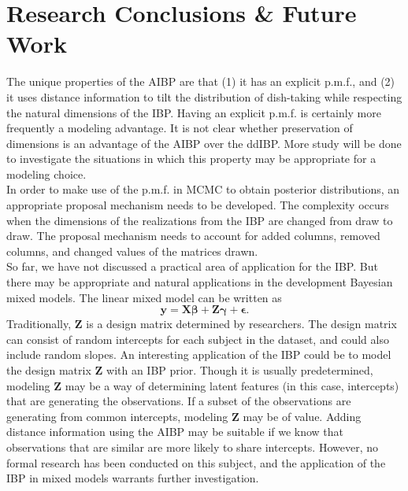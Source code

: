 \chapter{Research Conclusions \& Future Work}
The unique properties of the AIBP are that (1) it has an explicit p.m.f., and
(2) it uses distance information to tilt the distribution of dish-taking
while respecting the natural dimensions of the IBP. Having an explicit p.m.f.
is certainly more frequently a modeling advantage. It is not clear whether 
preservation of dimensions is an advantage of the AIBP over the ddIBP. More study
will be done to investigate the situations in which this property may be 
appropriate for a modeling choice.\\

\noindent
In order to make use of the p.m.f. in MCMC to obtain posterior distributions, an
appropriate proposal mechanism needs to be developed. The complexity occurs when
the dimensions of the realizations from the IBP are changed from draw to draw. 
The proposal mechanism needs to account for added columns, removed columns, and 
changed values of the matrices drawn. \\

\noindent
So far, we have not discussed a practical area of application for the IBP.
But there may be appropriate and natural applications in the development Bayesian
mixed models. The linear mixed model can be written as
\[
  \bm{y = X\beta + Z\gamma + \epsilon}.
\]
Traditionally, $\bm Z$ is a design matrix determined by researchers. The design
matrix can consist of random intercepts for each subject in the dataset, and
could also include random slopes. An interesting application of the IBP could
be to model the design matrix $\bm Z$ with an IBP prior. Though it is usually
predetermined, modeling $\bm Z$ may be a way of determining latent features (in
this case, intercepts) that are generating the observations. If a subset of the
observations are generating from common intercepts, modeling $\bm Z$ may be of
value. Adding distance information using the AIBP may be suitable if we know
that observations that are similar are more likely to share intercepts.
However, no formal research has been conducted on this subject, and the
application of the IBP in mixed models warrants further investigation.
